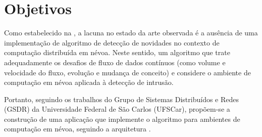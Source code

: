 
\section{Objetivos}\label{sec:objetivos}

Como estabelecido na , a lacuna no estado da arte observada é a
ausência de uma implementação de algoritmo de detecção de novidades no contexto
de computação distribuída em névoa.
Neste sentido, um algoritmo que trate adequadamente os desafios de fluxo de
dados contínuos (como volume e velocidade do fluxo, evolução e mudança de
conceito) e considere o ambiente de computação em névoa aplicada à detecção de
intrusão.

Portanto, seguindo os trabalhos do Grupo de Sistemas Distribuídos e Redes (GSDR)
da Universidade Federal de São Carlos (UFSCar), 
propõem-se a construção de uma
aplicação que implemente o algoritmo \minas \cite{Faria2016minas} para ambientes
de computação em névoa, seguindo a
arquitetura \arch \cite{Cassales2019}.

